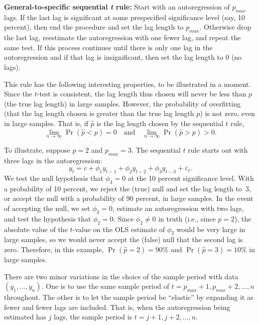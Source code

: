 \medskip
\noindent\textbf{General-to-specific sequential \textit{t} rule:} \; Start with an autoregression of $p_{max}$ lags.
If the last lag is significant at some prespecified significance level (say, 10 percent),
then end the procedure and set the lag length to $p_{max}$. Otherwise drop the
last lag, reestimate the autoregression with one fewer lag, and repeat the same
test. If this process continues until there is only one lag in the autoregression
and if that lag is insignificant, then set the lag length to 0 (no lags).

\medskip
This rule has the following interesting properties, to be illustrated in a moment. Since the
$t$-test is consistent, the lag length thus chosen will never be less than $p$ (the true lag
length) in large samples. However, the probability of overfitting (that the lag length
chosen is greater than the true lag length $p$) is not zero, even in large samples. That
is, if $\hat{p}$ is the lag length chosen by the sequential $t$ rule,
\begin{equation}
  \lim_{n \to \infty} \Pr(\hat{p} < p) = 0 \quad \text{and} \quad
  \lim_{n \to \infty} \Pr(\hat{p} > p) > 0.
  \label{eq:6.4.6}
\end{equation}

To illustrate, suppose $p = 2$ and $p_{max} = 3$. The sequential $t$ rule starts out
with three lags in the autoregression:
\[
  y_t = c + \phi_1 y_{t-1} + \phi_2 y_{t-2} + \phi_3 y_{t-3} + \varepsilon_t.
\]
We test the null hypothesis that $\phi_3 = 0$ at the 10 percent significance level. With
a probability of 10 percent, we reject the (true) null and set the lag length to~3, or
accept the null with a probability of 90 percent, in large samples. In the event of
accepting the null, we set $\phi_3 = 0$, estimate an autoregression with two lags, and test
the hypothesis that $\phi_2 = 0$. Since $\phi_2 \neq 0$ in truth (i.e., since $p = 2$), the absolute
value of the $t$-value on the OLS estimate of $\phi_2$ would be very large in large samples,
so we would never accept the (false) null that the second lag is zero. Therefore, in
this example, $\Pr(\hat{p} = 2) = 90\%$ and $\Pr(\hat{p} = 3) = 10\%$ in large samples.

There are two minor variations in the choice of the sample period with data
$(y_1, \ldots, y_n)$. One is to use the same sample period of $t = p_{max} + 1, p_{max} + 2, \ldots, n$
throughout. The other is to let the sample period be ``elastic'' by expanding it as
fewer and fewer lags are included. That is, when the autoregression being estimated
has $j$ lags, the sample period is $t = j + 1, j + 2, \ldots, n$.

